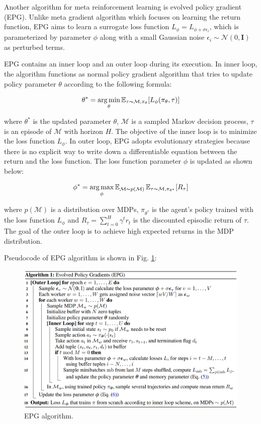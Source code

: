 Another algorithm for meta reinforcement learning is evolved policy gradient (EPG)\cite{epg}. Unlike meta gradient algorithm which focuses on learning the return function, EPG aims to learn a surrogate loss function $L_\phi = L_{\phi + \sigma\epsilon_i}$, which is parameterized by parameter $\phi$ along with a small Gaussian noise $\epsilon_i \sim \mathcal{N}(0, \mathbf{I})$ as perturbed terms.

\par
EPG contains an inner loop and an outer loop during its execution. In inner loop, the algorithm functions as normal policy gradient algorithm that tries to update policy parameter $\theta$ according to the following formula:

\[\theta^* = \operatorname*{arg\,min}_\theta\operatorname{\mathbb{E}}_{\tau\thicksim\mathcal{M},\pi_\theta}[L_\phi(\pi_\theta,\tau)]\]

where $\theta^*$ is the updated parameter $\theta$, $\mathcal{M}$ is a sampled Markov decision process, $\tau$ is an episode of $\mathcal{M}$ with horizon $\textit{H}$. The objective of the inner loop is to minimize the loss function $L_\phi$. In outer loop, EPG adopts evolutionary strategies because there is no explicit way to write down a differentiable equation between the return and the loss function. The loss function parameter $\phi$ is updated as shown below:

\[\phi^* = \operatorname*{arg\,max}_\phi\operatorname{\mathbb{E}}_{\mathcal{M}\thicksim p(\mathcal{M})}\operatorname{\mathbb{E}}_{\tau\thicksim\mathcal{M},\pi_{\theta^*}}[R_\tau]\]

where $p(\mathcal{M})$ is a distribution over MDPs, $\pi_{\theta^*}$ is the agent's policy trained with the loss function $L_\phi$ and $R_\tau = \sum_{t=0}^{H}\gamma^t{r_t}$ is the discounted episodic return of $\tau$. The goal of the outer loop is to achieve high expected returns in the MDP distribution.

\par
Pseudocode of EPG algorithm is shown in Fig. \ref{epg}:
\begin{figure}
	\includegraphics[scale=0.4]{epg.png}
	\centering
	\caption{EPG algorithm.}
	\label{epg}
\end{figure}

